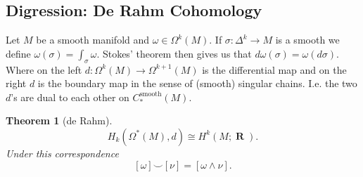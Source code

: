 \documentclass[10pt,]{book}
\theoremstyle{plain}
\newtheorem{theorem}{Theorem}[section]
\theoremstyle{definition}
\numberwithin{equation}{section}
\DeclareMathOperator{\RR}{\mathbf{R}}
\begin{document}
\typeout{************************************************}
\typeout{************************************************}
\subsection[Digression: De Rahm Cohomology]{Digression: De Rahm Cohomology}\label{subsection-11}
Let \(M\) be a smooth manifold and \(\omega\in \Omega^k(M)\).
            If \(\sigma\colon\Delta^k \to M\) is a smooth we define \(\omega(\sigma) = \int_\sigma \omega\).
            Stokes' theorem then gives us that \(d\omega (\sigma) = \omega (d\sigma)\).
            Where on the left \(d\colon \Omega^k(M) \to \Omega^{k+1}(M)\) is the differential map and on the right \(d\) is the boundary map in the sense of (smooth) singular chains.
            I.e. the two \(d\)'s are dual to each other on \(C_*^{\text{smooth}}(M)\).%
\begin{theorem}[de Rahm]\label{theorem-5}
\[H_k(\Omega^*(M), d) \cong H^k(M; \RR).\]
              Under this correspondence
              \[[\omega] \smile [\nu] = [\omega \wedge \nu].\]\end{theorem}
\end{document}
